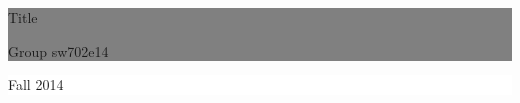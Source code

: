 %
%
%
%
	\thispagestyle{empty}

	\vspace*{\fill}

	\noindent \colorbox{gray}{
		\parbox{\textwidth}{%
			\color{white}%
			\begin{center}
				\Huge{{\selectfont Title}} %
			\end{center}
			\begin{center}
			\Large{\textsf{Group sw702e14}}\\
			[0.5cm] %
			\small{
			}
			\end{center}
		}}
		
	\vfill


	\begin{figure}[htbp]
	\centering
	\vspace{140px}
	\end{figure}
	
	\noindent \colorbox{white}{
		\begin{minipage}[b]{6.5cm}
		\begin{center}
			\end{center}
			\vspace*{-20px}
		\end{minipage}
	} 
	\hfill  
	\colorbox{white}{ 
		\begin{minipage}[b]{3.5cm}	 
			\flushright
			{\large Fall 2014} \\
		\end{minipage}
	}

\clearpage
